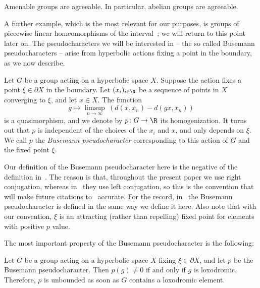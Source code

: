 \begin{cit}\label{amenable:agreeable}
Amenable groups are agreeable. In particular, abelian groups are agreeable.
\end{cit}

A further example, which is the most relevant for our purposes, is groups of piecewise linear homeomorphisms of the interval~\cite{calegari:PL}; we will return to this point later on. The pseudocharacters we will be interested in -- the so called Busemann pseudocharacters -- arise from hyperbolic actions fixing a point in the boundary, as we now describe.

\begin{defi}
Let $G$ be a group acting on a hyperbolic space $X$. Suppose the action fixes a point $\xi\in\partial X$ in the boundary. Let $(x_i)_{i\in\N}$ be a sequence of points in $X$ converging to $\xi$, and let $x\in X$. The function
\[
g\mapsto \displaystyle \limsup_{n\to\infty} \hspace{3pt} (d(x,x_n) - d(gx,x_n))
\]
is a quasimorphism, and we denote by $p\colon G\to\R$ its homogenization. It turns out that $p$ is independent of the choices of the $x_i$ and $x$, and only depends on $\xi$. We call $p$ the \emph{Busemann pseudocharacter} corresponding to this action of $G$ and the fixed point $\xi$.
\end{defi}

\begin{rema}\label{rem:left_right}
Our definition of the Busemann pseudocharacter here is the negative of the definition in~\cite{confining}. The reason is that, throughout the present paper we use right conjugation, whereas in~\cite{confining} they use left conjugation, so this is the convention that will make future citations to~\cite{confining} accurate. For the record, in~\cite{caprace15} the Busemann pseudocharacter is defined in the same way we define it here. Also note that with our convention, $\xi$ is an attracting (rather than repelling) fixed point for elements with positive $p$ value.
\end{rema}

The most important property of the Busemann pseudocharacter is the following:

\begin{cit}
\label{cit:busemann:loxodromic}
    Let $G$ be a group acting on a hyperbolic space $X$ fixing $\xi \in \partial X$, and let $p$ be the Busemann pseudocharacter. Then $p(g) \neq 0$ if and only if $g$ is loxodromic. Therefore, $p$ is unbounded as soon as $G$ contains a loxodromic element.
\end{cit}

